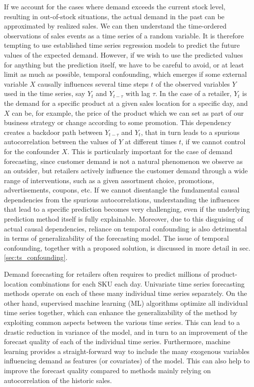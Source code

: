\documentclass[BCOR=1mm, DIV=calc,10pt,
twoside=true,
twocolumn,
headings=normal]{scrartcl}
\begin{document}
If we account for the cases where demand exceeds the current stock level, resulting in out-of-stock situations, the actual demand in the past can be approximated by realized sales. We can then understand the time-ordered observations of sales events as a time series of a random variable. It is therefore tempting to use established time series regression models to predict the future values of the expected demand. However, if we wish to use the predicted values for anything but the prediction itself, we have to be careful to avoid, or at least limit as much as possible, temporal confounding, which emerges if some external variable $X$ causally influences several time steps $t$ of the observed variables $Y$ used in the time series, say $Y_{t}$ and $Y_{t-\tau}$ with lag $\tau$. In the case of a retailer, $Y_{t}$ is the demand for a specific product at a given sales location for a specific day, and $X$ can be, for example, the price of the product which we can set as part of our business strategy or change according to some promotion. This dependency creates a backdoor path between $Y_{t-\tau}$ and $Y_{t}$, that in turn leads to a spurious autocorrelation between the values of $Y$ at different times $t$, if we cannot control for the confounder $X$. This is particularly important for the case of demand forecasting, since customer demand is not a natural phenomenon we observe as an outsider, but retailers actively influence the customer demand  through a wide range of interventions, such as a given assortment choice, promotions, advertisements, coupons, etc. If we cannot disentangle the fundamental causal dependencies from the spurious autocorrelations, understanding the influences that lead to a specific prediction becomes very challenging, even if the underlying prediction method itself is fully explainable. Moreover, due to this disguising of actual causal dependencies, reliance on temporal confounding is also detrimental in terms of generalizability of the forecasting model. The issue of temporal confounding, together with a proposed solution, is discussed in more detail in sec. \ref{sec:ts_confounding}.

Demand forecasting for retailers often requires to predict millions of product-location combinations for each SKU each day. Univariate time series forecasting methods operate on each of these many individual time series separately. On the other hand, supervised machine learning (ML) algorithms optimize all individual time series together, which can enhance the generalizability of the method by exploiting common aspects between the various time series. This can lead to a drastic reduction in variance of the model, and in turn to an improvement of the forecast quality of each of the individual time series. Furthermore, machine learning provides a straight-forward way to include the many exogenous variables influencing demand as features (or covariates) of the model. This can also help to improve the forecast quality compared to methods mainly relying on autocorrelation of the historic sales.
\end{document}

